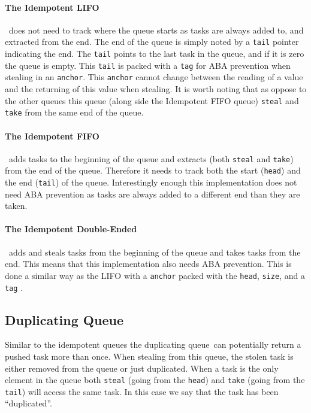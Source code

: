 \paragraph{The Idempotent LIFO}\,\cite[p. 47]{Michael:2009:IWS:1594835.1504186} does not need to track where the queue starts as tasks are always added to, and extracted from the end. The end of the queue is simply noted by a \texttt{tail} pointer indicating the end. The \texttt{tail} points to the last task in the queue, and if it is zero the queue is empty. This \texttt{tail} is packed with a \texttt{tag} for ABA prevention when stealing in an \texttt{anchor}. This \texttt{anchor} cannot change between the reading of a value and the returning of this value when stealing. It is worth noting that as oppose to the other queues this queue (along side the Idempotent FIFO queue) \texttt{steal} and \texttt{take} from the same end of the queue.

\paragraph{The Idempotent FIFO}\,\cite[p. 48]{Michael:2009:IWS:1594835.1504186}  adds tasks to the beginning of the queue and extracts (both \texttt{steal} and \texttt{take}) from the end of the queue. Therefore it needs to track both the start (\texttt{head}) and the end (\texttt{tail}) of the queue. Interestingly enough this implementation does not need ABA prevention as tasks are always added to a different end than they are taken.

\paragraph{The Idempotent Double-Ended} \,\cite[p. 49]{Michael:2009:IWS:1594835.1504186} adds and steals tasks from the beginning of the queue and takes tasks from the end. This means that this implementation also needs ABA prevention. This is done a similar way as the LIFO with a \texttt{anchor} packed with the \texttt{head}, \texttt{size}, and a \texttt{tag} .

\subsection{Duplicating Queue}
Similar to the idempotent queues the duplicating queue\,\cite[p. 233]{Leijen:2009:DTP:1639949.1640106} can potentially return a pushed task more than once. When stealing from this queue, the stolen task is either removed from the queue or just duplicated. When a task is the only element in the queue both \texttt{steal} (going from the \texttt{head}) and \texttt{take} (going from the \texttt{tail}) will access the same task. In this case we say that the task has been ``duplicated''.

